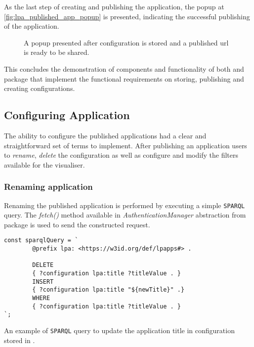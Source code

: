 As the last step of creating and publishing the \lpa{} application, the popup at \autoref{fig:lpa_published_app_popup} is presented, indicating the successful publishing of the application. 

\begin{figure}[h]
\centering
{}
\caption{A popup presented after configuration is stored and a published url is ready to be shared.}
\label{fig:lpa_published_app_popup}
\end{figure}

This concludes the demonstration of components and functionality of both \lpa{} and \lpas{} package that implement the functional requirements on storing, publishing and creating \lpa{} configurations. 

\subsection{Configuring Application}
\label{ssssec:configuring_application_implementation}

The ability to configure the published applications had a clear and straightforward set of terms to implement. After publishing an application \lpa{} users  to \textit{rename}, \textit{delete} the configuration as well as configure and modify the filters available for the visualiser.

\subsubsection{Renaming application}

Renaming the published application is performed by executing a simple \texttt{SPARQL} query. The \textit{fetch()} method available in \textit{AuthenticationManager} abstraction from \lpas{} package is used to send the constructed request. 

\begin{listing}[H]    
\begin{verbatim}
const sparqlQuery = `
        @prefix lpa: <https://w3id.org/def/lpapps#> .

        DELETE
        { ?configuration lpa:title ?titleValue . }
        INSERT
        { ?configuration lpa:title "${newTitle}" .}
        WHERE
        { ?configuration lpa:title ?titleValue . }
`;
\end{verbatim}
\caption{An example of \texttt{SPARQL} query to update the application title in configuration stored in \solid{}.} 
\label{lst:lpapp_sample_rename_app_sparql}
\end{listing}

